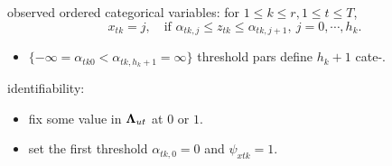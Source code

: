observed ordered categorical variables: for $1 \leq k \leq r, 1 \leq t \leq T$,
    \[x_{tk} = j, \quad \text{if } \alpha_{tk, j} \leq z_{tk} \leq \alpha_{tk, j+1},\ j = 0, \cdots, h_k.\]
    \begin{itemize}
        \item $\{-\infty = \alpha_{tk0} < \alpha_{tk, h_k+1} = \infty\}$ threshold pars define $h_k+1$ cate-.
    \end{itemize}

identifiability: \begin{itemize}
    \item fix some value in $\boldsymbol{\Lambda}_{ut}$ at $0$ or $1$.
    \item set the first threshold $\alpha_{tk, 0} = 0$ and $\psi_{xtk} = 1$.
\end{itemize}



